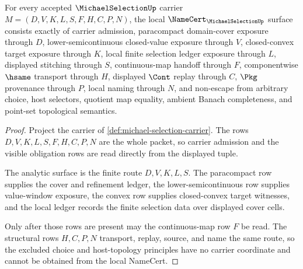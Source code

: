 \begin{theorem}
\label{thm:michael-selection-namecert-obligations}
For every accepted $\MichaelSelectionUp$ carrier $M=(D,V,K,L,S,F,H,C,P,N)$, the local $\NameCert_{\MichaelSelectionUp}$ surface consists exactly of carrier admission, paracompact domain-cover exposure through $D$, lower-semicontinuous closed-value exposure through $V$, closed-convex target exposure through $K$, local finite selection ledger exposure through $L$, displayed stitching through $S$, continuous-map handoff through $F$, componentwise $\hsame$ transport through $H$, displayed $\Cont$ replay through $C$, $\Pkg$ provenance through $P$, local naming through $N$, and non-escape from arbitrary choice, host selectors, quotient map equality, ambient Banach completeness, and point-set topological semantics.
\end{theorem}
\begin{proof}
Project the carrier of \autoref{def:michael-selection-carrier}. The rows $D,V,K,L,S,F,H,C,P,N$ are the whole packet, so carrier admission and the visible obligation rows are read directly from the displayed tuple.

The analytic surface is the finite route $D,V,K,L,S$. The paracompact row supplies the cover and refinement ledger, the lower-semicontinuous row supplies value-window exposure, the convex row supplies closed-convex target witnesses, and the local ledger records the finite selection data over displayed cover cells.

Only after those rows are present may the continuous-map row $F$ be read. The structural rows $H,C,P,N$ transport, replay, source, and name the same route, so the excluded choice and host-topology principles have no carrier coordinate and cannot be obtained from the local NameCert.
\end{proof}

